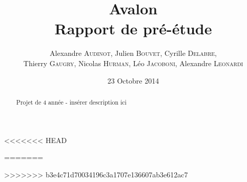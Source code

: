 \documentclass[a4paper,11pt]{article}
\title{
  \textbf{Avalon}\\
  Rapport de pré-étude
}
\author{
  Alexandre \textsc{Audinot},
  Julien \textsc{Bouvet},
  Cyrille \textsc{Delabre}, \\
  Thierry \textsc{Gaugry},
  Nicolas \textsc{Hurman},
  Léo \textsc{Jacoboni},
  Alexandre \textsc{Leonardi}
}
\date{23 Octobre 2014}
\begin{document}
\maketitle
\thispagestyle{empty}
\begin{abstract}
Projet de 4 année - insérer description ici
\end{abstract}
\pagebreak

\tableofcontents
\pagebreak

<<<<<<< HEAD



=======

>>>>>>> b3e4c71d70034196c3a1707e136607ab3e612ac7


\end{document}
